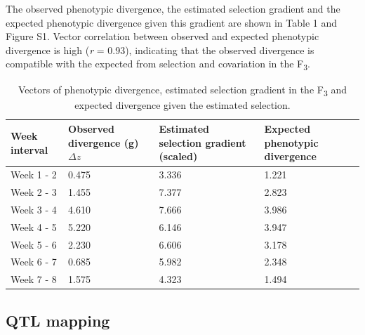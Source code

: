 \begin{refsection}
The observed phenotypic divergence, the estimated selection gradient and
the expected phenotypic divergence given this gradient are shown in
Table 1 and Figure S1. Vector correlation between observed and expected
phenotypic divergence is high (\emph{r} = 0.93), indicating that the observed
divergence is compatible with the expected from selection and
covariation in the F\textsubscript{3}.

\begin{table}[htbp]
	\caption[Evolutionary vectors]{Vectors of phenotypic divergence, estimated selection gradient
			 in the F\textsubscript{3} and expected divergence given the estimated
			 selection.}
	\vspace{1em}
	\centering
	\begin{tabular}{l|p{30mm} p{30mm} p{40mm}}
		\toprule
		Week interval & Observed \newline divergence (g) $\Delta z$ & Estimated \newline selection gradient (scaled) & Expected \newline phenotypic divergence \\
		\midrule
		Week 1 - 2 & 0.475 & 3.336 & 1.221 \\
		Week 2 - 3 & 1.455 & 7.377 & 2.823 \\
		Week 3 - 4 & 4.610 & 7.666 & 3.986 \\
		Week 4 - 5 & 5.220 & 6.146 & 3.947 \\
		Week 5 - 6 & 2.230 & 6.606 & 3.178 \\
		Week 6 - 7 & 0.685 & 5.982 & 2.348 \\
		Week 7 - 8 & 1.575 & 4.323 & 1.494 \\
		\bottomrule
	\end{tabular}
\end{table}

\subsection{QTL mapping}


\end{refsection}

